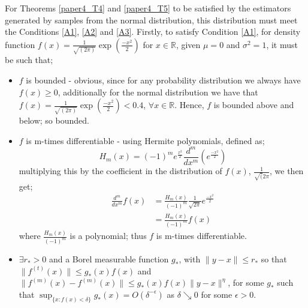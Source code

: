 \documentclass{article}
\begin{document}
For Theorems \ref{paper4_T4} and \ref{paper4_T5} to be satisfied by the estimators generated by samples from the normal distribution, this distribution must meet the Conditions \ref{A1}, \ref{A2} and \ref{A3}. 
Firstly, to satisfy Condition \ref{A1}, for density function $f(x) = \frac{1}{\sqrt{(2\pi)}} \exp{ \left( \frac{-x^2}{2} \right)}$ for $x \in \mathbb{R}$, given $\mu = 0$ and $\sigma^2 = 1$, it must be such that;
\begin{itemize}
\item $f$ is bounded - obvious, since for any probability distribution we always have $f(x) \geq 0$, additionally for the normal distribution we have that $f(x) = \frac{1}{\sqrt{(2\pi)}} \exp{ \left( \frac{-x^2}{2} \right)} < 0.4$, $\forall x \in \mathbb{R}$. Hence, $f$ is bounded above and below; so bounded.

\item $f$ is m-times differentiable - using Hermite polynomials, defined as;
\begin{equation}
H_{m}(x) = (-1)^m e^{\frac{x^2}{2}} \frac{d^m}{dx^m} \left(e^{\frac{-x^2}{2}} \right) \nonumber
\end{equation}
multiplying this by the coefficient in the distribution of $f(x)$, $\frac{1}{\sqrt(2 \pi}$, we then get;
\begin{align*}
 \frac{d^m}{dx^m} f(x) &= \frac{H_{m}(x)}{(-1)^m} \frac{1}{\sqrt{2 \pi}} e^{\frac{-x^2}{2}} \\ 
&= \frac{H_{m}(x)}{(-1)^m} f(x) 
\end{align*}
where $\frac{H_{m}(x)}{(-1)^m}$ is a polynomial; thus $f$ is m-times differentiable.

\item $\exists r_{*} > 0$ and a Borel measurable function $g_{*}$, with $\|y-x\| \leq r_{*}$ so that $\|f^{(t)}(x)\| \leq g_{*}(x) f(x)$ and $\|f^{(m)}(x) - f^{(m)}(x)\| \leq g_{*}(x) f(x)\|y - x\|^{\eta}$, for some $g_{*}$ such that $\sup_{\{x : f(x) < \delta\}} g_{*}(x) = O(\delta^{-\epsilon})$ as $\delta \searrow 0$ for some $\epsilon >0$. 


\end{itemize}
\end{document}
